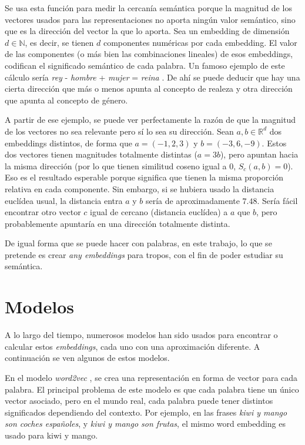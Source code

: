 Se usa esta función para medir la cercanía semántica porque la magnitud de los vectores usados para las representaciones no aporta
ningún valor semántico, sino que es la dirección del vector la que lo aporta. Sea un embedding de dimensión $d\in\mathbb{N}$, es decir,
se tienen $d$ componentes numéricas por cada embedding. El valor de las componentes (o más bien las combinaciones lineales) de esos embeddings,
codifican el significado semántico de cada palabra. Un famoso ejemplo de este cálculo sería \emph{rey} - \emph{hombre} + \emph{mujer} = \emph{reina} \cite{drozd-etal-2016-word}.
De ahí se puede deducir que hay una cierta dirección que más o menos apunta al concepto de realeza y otra dirección que apunta al concepto de género.

A partir de ese ejemplo, se puede ver perfectamente la razón de que la magnitud de los vectores no sea relevante pero sí lo sea su dirección. Sean $a,b\in\mathbb{R}^d$ dos embeddings
distintos, de forma que $a=(-1, 2, 3)$ y $b=(-3, 6, -9)$. Estos dos vectores tienen magnitudes totalmente distintas ($a=3b$), pero apuntan hacia la misma dirección
(por lo que tienen similitud coseno igual a 0, $S_c(a,b)=0$). Eso es el resultado esperable porque significa que tienen la misma proporción relativa en cada componente.
Sin embargo, si se hubiera usado la distancia euclídea usual, la distancia entra $a$ y $b$ sería de aproximadamente $7.48$. Sería fácil encontrar otro vector $c$ igual de cercano (distancia euclídea) a $a$
que $b$, pero probablemente apuntaría en una dirección totalmente distinta.

De igual forma que se puede hacer con palabras, en este trabajo, lo que se pretende es crear \textit{any embeddings} para tropos, con el fin de poder estudiar
su semántica.

\section{Modelos}

A lo largo del tiempo, numerosos modelos han sido usados para encontrar o calcular estos \textit{embeddings}, cada uno
con una aproximación diferente. A continuación se ven algunos de estos modelos.

En el modelo \emph{word2vec} \cite{word2vec:1} \cite{word2vec:2}, se crea una representación
en forma de vector para cada palabra. El principal problema de este modelo es que cada palabra tiene un único vector asociado,
pero en el mundo real, cada palabra puede tener distintos significados dependiendo del contexto.
Por ejemplo, en las frases \emph{kiwi y mango son coches españoles}, y \emph{kiwi y mango son frutas},
el mismo word embedding es usado para kiwi y mango.

